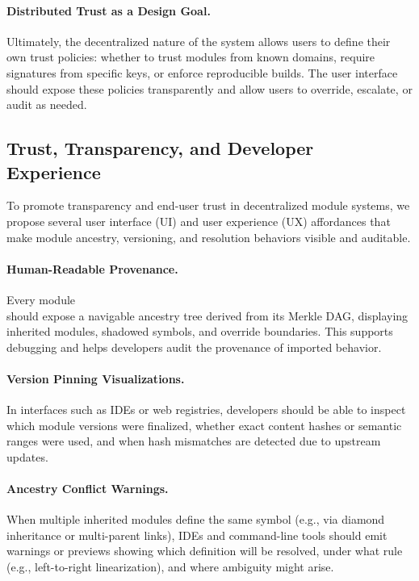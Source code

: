 \documentclass[sigplan,screen]{acmart}
\begin{document}
\paragraph{Distributed Trust as a Design Goal.}
Ultimately, the decentralized nature of the system allows users to define their own trust policies: whether to trust modules from known domains, require signatures from specific keys, or enforce reproducible builds. The user interface should expose these policies transparently and allow users to override, escalate, or audit as needed.

\subsection{Trust, Transparency, and Developer Experience}
\label{sec:trust-ux}

To promote transparency and end-user trust in decentralized module systems, we propose several user interface (UI) and user experience (UX) affordances that make module ancestry, versioning, and resolution behaviors visible and auditable.

\paragraph{Human-Readable Provenance.}
Every module \\should expose a navigable ancestry tree derived from its Merkle DAG, displaying inherited modules, shadowed symbols, and override boundaries. This supports debugging and helps developers audit the provenance of imported behavior.

\paragraph{Version Pinning Visualizations.}
In interfaces such as IDEs or web registries, developers should be able to inspect which module versions were finalized, whether exact content hashes or semantic ranges were used, and when hash mismatches are detected due to upstream updates.

\paragraph{Ancestry Conflict Warnings.}
When multiple inherited modules define the same symbol (e.g., via diamond inheritance or multi-parent links), IDEs and command-line tools should emit warnings or previews showing which definition will be resolved, under what rule (e.g., left-to-right linearization), and where ambiguity might arise.
\end{document}
